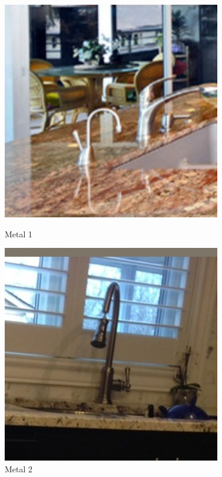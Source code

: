 \documentclass[conference, compsoc, 12pt]{IEEEtran}
\begin{document}
\begin{figure}[ht]
  \label{fig2}
  \begin{minipage}[b]{0.5\linewidth}
    \centering
    \includegraphics[width=.8\linewidth]{metal_000001.jpg}
    \caption{Metal 1}
    \vspace{4ex}
  \end{minipage}%
  \begin{minipage}[b]{0.5\linewidth}
    \centering
    \includegraphics[width=.8\linewidth]{metal_000012.jpg}
    \caption{Metal 2}
    \vspace{4ex}
  \end{minipage}

\end{figure}
\end{document}
